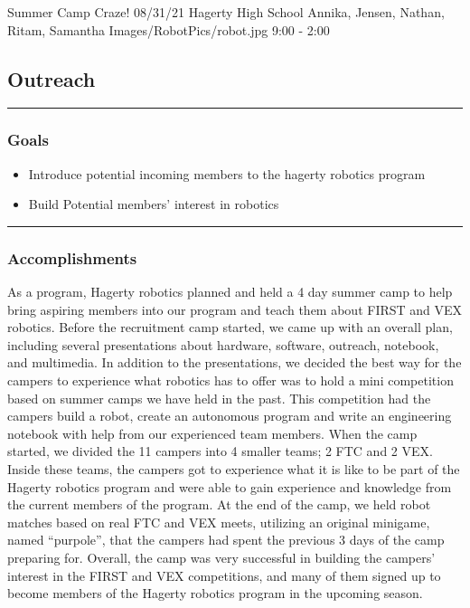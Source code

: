 \insertmeeting 
	{Summer Camp Craze!} 
	{08/31/21}
	{Hagerty High School}
	{Annika, Jensen, Nathan, Ritam, Samantha}
	{Images/RobotPics/robot.jpg}
	{9:00 - 2:00}
	
\subsection*{Outreach}
\noindent\hfil\rule{\textwidth}{.4pt}\hfil
\subsubsection*{Goals}
\begin{itemize}
    \item Introduce potential incoming members to the hagerty robotics program
    \item Build Potential members' interest in robotics

\end{itemize} 

\noindent\hfil\rule{\textwidth}{.4pt}\hfil

\subsubsection*{Accomplishments}
As a program, Hagerty robotics planned and held a 4 day summer camp to help bring aspiring members into our program and teach them about FIRST and VEX robotics. Before the recruitment camp started, we came up with an overall plan, including several presentations about hardware, software, outreach, notebook, and multimedia. In addition to the presentations, we decided the best way for the campers to experience what robotics has to offer was to hold a mini competition based on summer camps we have held in the past. This competition had the campers build a robot, create an autonomous program and write an engineering notebook with help from our experienced team members. When the camp started, we divided the 11 campers into 4 smaller teams; 2 FTC and 2 VEX. Inside these teams, the campers got to experience what it is like to be part of the Hagerty robotics program and were able to gain experience and knowledge from the current members of the program. At the end of the camp, we held robot matches based on real FTC and VEX meets, utilizing an original minigame, named “purpole”, that the campers had spent the previous 3 days of the camp preparing for. Overall, the camp was very successful in building the campers’ interest in the FIRST and VEX competitions, and many of them signed up to become members of the Hagerty robotics program in the upcoming season.

